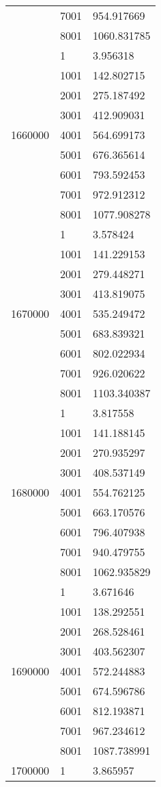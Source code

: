 \begin{table}[htb!]
\begin{tabular}{lll}
 & 7001 & 954.917669 \\
 & 8001 & 1060.831785 \\
\multirow[c]{9}{*}{1660000} & 1 & 3.956318 \\
 & 1001 & 142.802715 \\
 & 2001 & 275.187492 \\
 & 3001 & 412.909031 \\
 & 4001 & 564.699173 \\
 & 5001 & 676.365614 \\
 & 6001 & 793.592453 \\
 & 7001 & 972.912312 \\
 & 8001 & 1077.908278 \\
\multirow[c]{9}{*}{1670000} & 1 & 3.578424 \\
 & 1001 & 141.229153 \\
 & 2001 & 279.448271 \\
 & 3001 & 413.819075 \\
 & 4001 & 535.249472 \\
 & 5001 & 683.839321 \\
 & 6001 & 802.022934 \\
 & 7001 & 926.020622 \\
 & 8001 & 1103.340387 \\
\multirow[c]{9}{*}{1680000} & 1 & 3.817558 \\
 & 1001 & 141.188145 \\
 & 2001 & 270.935297 \\
 & 3001 & 408.537149 \\
 & 4001 & 554.762125 \\
 & 5001 & 663.170576 \\
 & 6001 & 796.407938 \\
 & 7001 & 940.479755 \\
 & 8001 & 1062.935829 \\
\multirow[c]{9}{*}{1690000} & 1 & 3.671646 \\
 & 1001 & 138.292551 \\
 & 2001 & 268.528461 \\
 & 3001 & 403.562307 \\
 & 4001 & 572.244883 \\
 & 5001 & 674.596786 \\
 & 6001 & 812.193871 \\
 & 7001 & 967.234612 \\
 & 8001 & 1087.738991 \\
\multirow[c]{9}{*}{1700000} & 1 & 3.865957 \\

\end{tabular}
\end{table}

